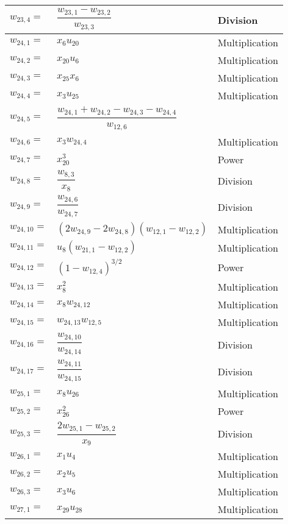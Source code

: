 \begin{longtable}{|p{1.5cm}|l|p{2cm}|}
$w_{23,4}=$ & $ \dfrac{w_{23,1}-w_{23,2}}{w_{23,3}} $ & Division \\ \hline
$w_{24,1}=$ & $ x_{6}u_{20} $ & Multiplication \\ \hline
$w_{24,2}=$ & $ x_{20}u_{6} $ & Multiplication \\ \hline
$w_{24,3}=$ & $ x_{25}x_{6} $ & Multiplication \\ \hline
$w_{24,4}=$ & $ x_{3}u_{25} $ & Multiplication \\ \hline
$w_{24,5}=$ & $ \dfrac{w_{24,1}+w_{24,2}-w_{24,3}-w_{24,4}}{w_{12,6}} $ &  \\ \hline
$w_{24,6}=$ & $ x_{3}w_{24,4} $ & Multiplication \\ \hline
$w_{24,7}=$ & $ x_{20}^{3} $ & Power \\ \hline
$w_{24,8}=$ & $ \dfrac{w_{8,3}}{x_{8}} $ & Division \\ \hline
$w_{24,9}=$ & $ \dfrac{w_{24,6}}{w_{24,7}} $ & Division \\ \hline
$w_{24,10}=$ & $ \left(2w_{24,9}-2w_{24,8}\right)\left(w_{12,1}-w_{12,2}\right) $ & Multiplication \\ \hline
$w_{24,11}=$ & $ u_{8}\left(w_{21,1}-w_{12,2}\right) $ & Multiplication \\ \hline
$w_{24,12}=$ & $ \left(1-w_{12,4}\right)^{3/2} $ & Power \\ \hline
$w_{24,13}=$ & $ x_{8}^{2} $ & Multiplication \\ \hline
$w_{24,14}=$ & $ x_{8}w_{24,12} $ & Multiplication \\ \hline
$w_{24,15}=$ & $ w_{24,13}w_{12,5} $ & Multiplication \\ \hline
$w_{24,16}=$ & $ \dfrac{w_{24,10}}{w_{24,14}} $ & Division \\ \hline
$w_{24,17}=$ & $ \dfrac{w_{24,11}}{w_{24,15}} $ & Division \\ \hline
$w_{25,1}=$ & $ x_{8}u_{26} $ & Multiplication \\ \hline
$w_{25,2}=$ & $ x_{26}^{2} $ & Power \\ \hline
$w_{25,3}=$ & $ \dfrac{2w_{25,1}-w_{25,2}}{x_{9}} $ & Division  \\ \hline
$w_{26,1}=$ & $ x_{1}u_{4} $ & Multiplication \\ \hline
$w_{26,2}=$ & $ x_{2}u_{5} $ & Multiplication \\ \hline
$w_{26,3}=$ & $ x_{3}u_{6} $ & Multiplication \\ \hline
$w_{27,1}=$ & $ x_{29}u_{28} $ & Multiplication \\ \hline

\end{longtable}

